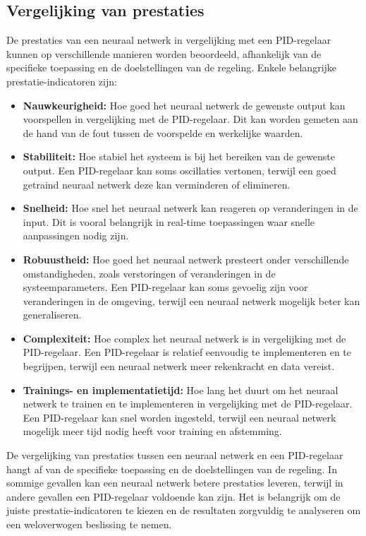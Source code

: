 \subsection{Vergelijking van prestaties}
De prestaties van een neuraal netwerk in vergelijking met een PID-regelaar kunnen op verschillende manieren worden beoordeeld, afhankelijk van de specifieke toepassing en de doelstellingen van de regeling. Enkele belangrijke prestatie-indicatoren zijn:
\begin{itemize}
  \item \textbf{Nauwkeurigheid:} Hoe goed het neuraal netwerk de gewenste output kan voorspellen in vergelijking met de PID-regelaar. Dit kan worden gemeten aan de hand van de fout tussen de voorspelde en werkelijke waarden.
  \item \textbf{Stabiliteit:} Hoe stabiel het systeem is bij het bereiken van de gewenste output. Een PID-regelaar kan soms oscillaties vertonen, terwijl een goed getraind neuraal netwerk deze kan verminderen of elimineren.
  \item \textbf{Snelheid:} Hoe snel het neuraal netwerk kan reageren op veranderingen in de input. Dit is vooral belangrijk in real-time toepassingen waar snelle aanpassingen nodig zijn.
  \item \textbf{Robuustheid:} Hoe goed het neuraal netwerk presteert onder verschillende omstandigheden, zoals verstoringen of veranderingen in de systeemparameters. Een PID-regelaar kan soms gevoelig zijn voor veranderingen in de omgeving, terwijl een neuraal netwerk mogelijk beter kan generaliseren.
  \item \textbf{Complexiteit:} Hoe complex het neuraal netwerk is in vergelijking met de PID-regelaar. Een PID-regelaar is relatief eenvoudig te implementeren en te begrijpen, terwijl een neuraal netwerk meer rekenkracht en data vereist.
  \item \textbf{Trainings- en implementatietijd:} Hoe lang het duurt om het neuraal netwerk te trainen en te implementeren in vergelijking met de PID-regelaar. Een PID-regelaar kan snel worden ingesteld, terwijl een neuraal netwerk mogelijk meer tijd nodig heeft voor training en afstemming.
\end{itemize}
De vergelijking van prestaties tussen een neuraal netwerk en een PID-regelaar hangt af van de specifieke toepassing en de doelstellingen van de regeling. In sommige gevallen kan een neuraal netwerk betere prestaties leveren, terwijl in andere gevallen een PID-regelaar voldoende kan zijn. Het is belangrijk om de juiste prestatie-indicatoren te kiezen en de resultaten zorgvuldig te analyseren om een weloverwogen beslissing te nemen.
